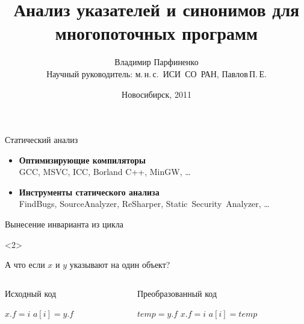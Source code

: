 \documentclass[usenames,dvipsnames,pdftex,unicode]{beamer}
\title[Анализ указателей и синонимов]{
  Анализ указателей и синонимов для многопоточных программ
}
\author[Владимир Парфиненко]{
  Владимир Парфиненко
  \texorpdfstring{%
    \\ \small Научный руководитель: м.\,н.\,с.~ИСИ~СО~РАН, Павлов\,П.\,Е.
  }{}%
}
\institute{
  Новосибирский Государственный Университет
}
\date{
  Новосибирск, 2011
}
\begin{document}
\begin{frame}
  \titlepage
\end{frame}

\begin{frame}{Статический анализ}

  \begin{itemize}
    \item \textbf{Оптимизирующие компиляторы}\\
        GCC, MSVC, ICC, Borland C++, MinGW, \ldots
    \item \textbf{Инструменты статического анализа}\\
        FindBugs, SourceAnalyzer, ReSharper, Static~Security~Analyzer, \ldots
  \end{itemize}

\end{frame}

\begin{frame}{Вынесение инварианта из цикла}

  \begin{visibleenv}<2>
    \begin{center}
      \large А что если $x$ и $y$ указывают на один объект?
    \end{center}
  \end{visibleenv}

  \begin{columns}[t]
    \begin{column}{5cm}
      \begin{block}{Исходный код}
        \begin{algorithmic}
          \STATE $x.f = i$
          \STATE $a[i] = y.f$
          \ENDFOR
        \end{algorithmic}
      \end{block}
    \end{column}
    \begin{column}{5cm}
      \begin{block}{Преобразованный код}
        \begin{algorithmic}
          \STATE $temp = y.f$
          \STATE $x.f = i$
          \STATE $a[i] = temp$
          \ENDFOR
        \end{algorithmic}
      \end{block}
    \end{column}
  \end{columns}

\end{frame}
\end{document}
